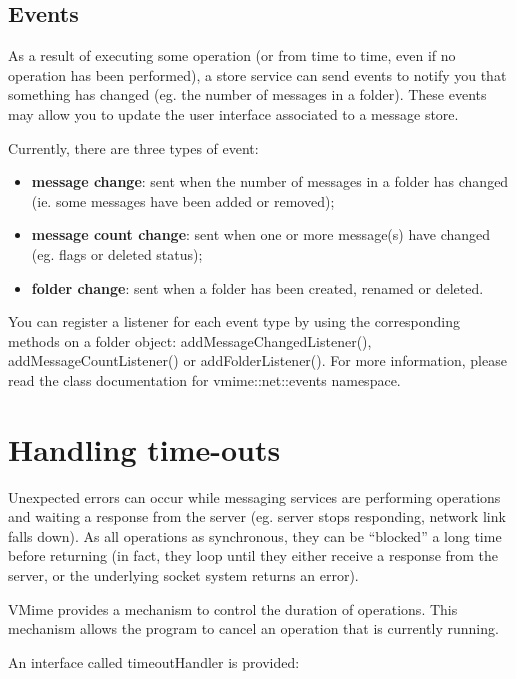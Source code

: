 \subsection{Events} %

As a result of executing some operation (or from time to time, even if no
operation has been performed), a store service can send events to notify you
that something has changed (eg. the number of messages in a folder). These
events may allow you to update the user interface associated to a message
store.

Currently, there are three types of event:

\begin{itemize}
\item {\bf message change}: sent when the number of messages in a folder
has changed (ie. some messages have been added or removed);
\item {\bf message count change}: sent when one or more message(s) have
changed (eg. flags or deleted status);
\item {\bf folder change}: sent when a folder has been created, renamed or
deleted.
\end{itemize}

You can register a listener for each event type by using the corresponding
methods on a {\vcode folder} object: {\vcode addMessageChangedListener()},
{\vcode addMessageCountListener()} or {\vcode addFolderListener()}. For more
information, please read the class documentation for
{\vcode vmime::net::events} namespace.


\section{Handling time-outs}

Unexpected errors can occur while messaging services are performing
operations and waiting a response from the server (eg. server stops
responding, network link falls down). As all operations as synchronous,
they can be ``blocked'' a long time before returning (in fact, they loop
until they either receive a response from the server, or the underlying
socket system returns an error).

VMime provides a mechanism to control the duration of operations. This
mechanism allows the program to cancel an operation that is currently
running.

An interface called {\vcode timeoutHandler} is provided:

